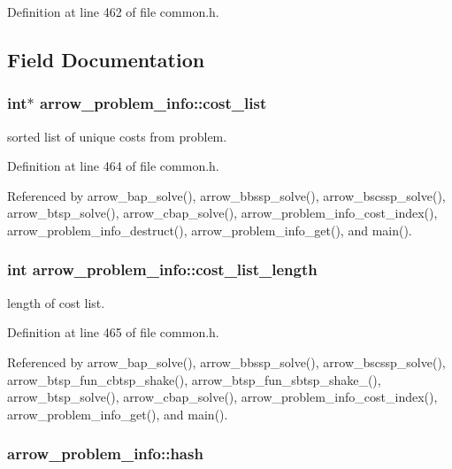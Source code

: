 Definition at line 462 of file common.h.

\subsection{Field Documentation}
\hypertarget{structarrow__problem__info_7c9472312d7057fb9d74eb5579930216}{
\subsubsection[{cost\_\-list}]{\setlength{\rightskip}{0pt plus 5cm}int$\ast$ {\bf arrow\_\-problem\_\-info::cost\_\-list}}}
\label{structarrow__problem__info_7c9472312d7057fb9d74eb5579930216}


sorted list of unique costs from problem. 

Definition at line 464 of file common.h.

Referenced by arrow\_\-bap\_\-solve(), arrow\_\-bbssp\_\-solve(), arrow\_\-bscssp\_\-solve(), arrow\_\-btsp\_\-solve(), arrow\_\-cbap\_\-solve(), arrow\_\-problem\_\-info\_\-cost\_\-index(), arrow\_\-problem\_\-info\_\-destruct(), arrow\_\-problem\_\-info\_\-get(), and main().\hypertarget{structarrow__problem__info_54bbdc187af19361072480b45016f171}{
\subsubsection[{cost\_\-list\_\-length}]{\setlength{\rightskip}{0pt plus 5cm}int {\bf arrow\_\-problem\_\-info::cost\_\-list\_\-length}}}
\label{structarrow__problem__info_54bbdc187af19361072480b45016f171}


length of cost list. 

Definition at line 465 of file common.h.

Referenced by arrow\_\-bap\_\-solve(), arrow\_\-bbssp\_\-solve(), arrow\_\-bscssp\_\-solve(), arrow\_\-btsp\_\-fun\_\-cbtsp\_\-shake(), arrow\_\-btsp\_\-fun\_\-sbtsp\_\-shake\_(), arrow\_\-btsp\_\-solve(), arrow\_\-cbap\_\-solve(), arrow\_\-problem\_\-info\_\-cost\_\-index(), arrow\_\-problem\_\-info\_\-get(), and main().\hypertarget{structarrow__problem__info_d62672139bdce70b23d8c72ecd96ff0d}{
\subsubsection[{hash}]{ {\bf arrow\_\-problem\_\-info::hash}}}
\label{structarrow__problem__info_d62672139bdce70b23d8c72ecd96ff0d}


